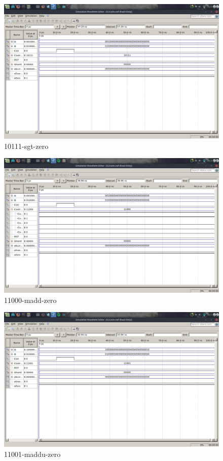 \documentclass[12pt]{article}
\begin{document}
\begin{figure}[H]
	\centering
	\includegraphics[width=.8\textwidth]{10111-sgt-zero.png}
	\caption{10111-sgt-zero}
	\label{10111-sgt-zero}
\end{figure}

\begin{figure}[H]
	\centering
	\includegraphics[width=.8\textwidth]{11000-madd-zero.png}
	\caption{11000-madd-zero}
	\label{fig:11000-madd-zero}
\end{figure}

\begin{figure}[H]
	\centering
	\includegraphics[width=.8\textwidth]{11001-maddu-zero.png}
	\caption{11001-maddu-zero}
	\label{fig:11001-maddu-zero}
\end{figure}
\end{document}
